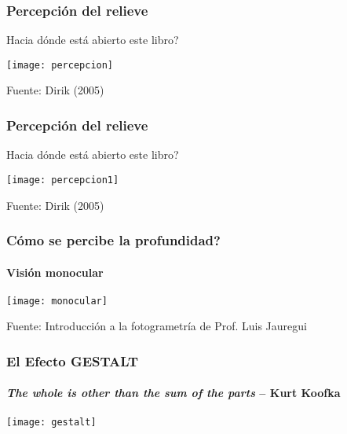 \documentclass[14pt]{beamer}
\begin{document}
\begin{frame}
\frametitle{Percepción del relieve}
\scriptsize{Hacia dónde está abierto este libro?}
\begin{center}
\texttt{[image: percepcion]}
\end{center}
\tiny{Fuente: Dirik (2005)}
\end{frame}
\begin{frame}
\frametitle{Percepción del relieve}
\scriptsize{Hacia dónde está abierto este libro?}
\begin{center}
\texttt{[image: percepcion1]}
\end{center}
\tiny{Fuente: Dirik (2005)}
\end{frame}
\begin{frame}
\frametitle{Cómo se percibe la profundidad?}
\framesubtitle{Visión monocular}
\begin{center}
\texttt{[image: monocular]}
\end{center}
\tiny{Fuente: Introducción a la fotogrametría de Prof. Luis Jauregui}
\end{frame}
\begin{frame}
\frametitle{El Efecto GESTALT}
\framesubtitle{\emph{The whole is other than the sum of the parts} -- \tiny{Kurt Koofka}}
\begin{center}
\texttt{[image: gestalt]}
\end{center}
\end{frame}
\end{document}
